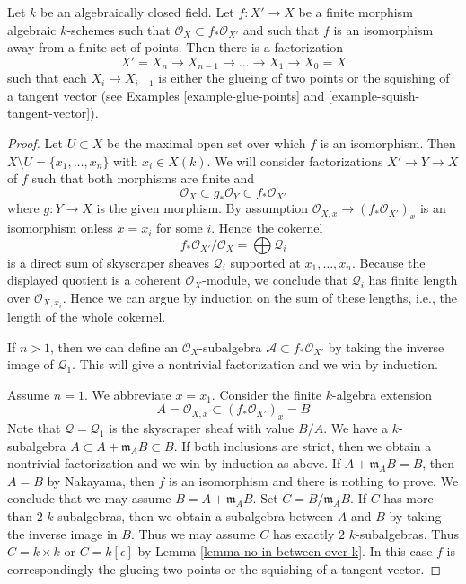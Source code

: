 \begin{lemma}
\label{lemma-factor-almost-isomorphism}
Let $k$ be an algebraically closed field. Let $f : X' \to X$ be a
finite morphism algebraic $k$-schemes such that
$\mathcal{O}_X \subset f_*\mathcal{O}_{X'}$ and such that $f$ is an
isomorphism away from a finite set of points. Then there is a factorization
$$
X' = X_n \to X_{n - 1} \to \ldots \to X_1 \to X_0 = X
$$
such that each $X_i \to X_{i - 1}$ is either the glueing of
two points or the squishing of a tangent vector
(see Examples \ref{example-glue-points} and
\ref{example-squish-tangent-vector}).
\end{lemma}

\begin{proof}
Let $U \subset X$ be the maximal open set over which $f$ is an isomorphism.
Then $X \setminus U = \{x_1, \ldots, x_n\}$ with $x_i \in X(k)$.
We will consider factorizations $X' \to Y \to X$ of $f$ such that
both morphisms are finite and
$$
\mathcal{O}_X \subset g_*\mathcal{O}_Y \subset f_*\mathcal{O}_{X'}
$$
where $g : Y \to X$ is the given morphism. By assumption
$\mathcal{O}_{X, x} \to (f_*\mathcal{O}_{X'})_x$ is an isomorphism
onless $x = x_i$ for some $i$. Hence the cokernel
$$
f_*\mathcal{O}_{X'}/\mathcal{O}_X = \bigoplus \mathcal{Q}_i
$$
is a direct sum of skyscraper sheaves $\mathcal{Q}_i$ supported at
$x_1, \ldots, x_n$.
Because the displayed quotient is a coherent $\mathcal{O}_X$-module,
we conclude that $\mathcal{Q}_i$ has finite length over
$\mathcal{O}_{X, x_i}$. Hence we can argue
by induction on the sum of these lengths, i.e., the length of
the whole cokernel.

\medskip\noindent
If $n > 1$, then we can define an $\mathcal{O}_X$-subalgebra
$\mathcal{A} \subset f_*\mathcal{O}_{X'}$ by taking the inverse
image of $\mathcal{Q}_1$. This will give a nontrivial factorization
and we win by induction.

\medskip\noindent
Assume $n = 1$. We abbreviate $x = x_1$. Consider the finite
$k$-algebra extension
$$
A = \mathcal{O}_{X, x} \subset (f_*\mathcal{O}_{X'})_x = B
$$
Note that $\mathcal{Q} = \mathcal{Q}_1$ is the skyscraper sheaf
with value $B/A$.
We have a $k$-subalgebra $A \subset A + \mathfrak m_A B \subset B$.
If both inclusions are strict, then we obtain a nontrivial
factorization and we win by induction as above.
If $A + \mathfrak m_A B = B$, then $A = B$ by Nakayama, then
$f$ is an isomorphism and there is nothing to prove.
We conclude that we may assume $B = A + \mathfrak m_A B$.
Set $C = B/\mathfrak m_A B$. If $C$ has more than $2$
$k$-subalgebras, then we obtain a subalgebra between $A$
and $B$ by taking the inverse image in $B$. Thus we may
assume $C$ has exactly $2$ $k$-subalgebras. Thus $C = k \times k$
or $C = k[\epsilon]$ by Lemma \ref{lemma-no-in-between-over-k}.
In this case $f$ is correspondingly the glueing two points or the
squishing of a tangent vector.
\end{proof}

